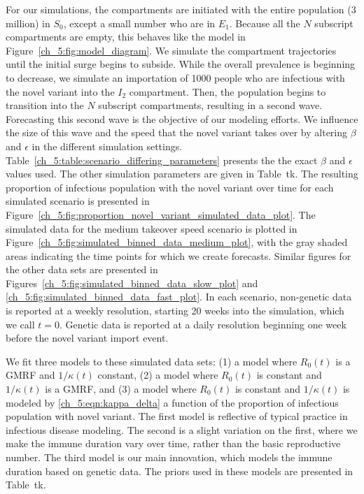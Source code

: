 For our simulations, the compartments are initiated with the entire population (3 million) in \( S_0 \), except a small number who are in \( E_1 \).
Because all the \( N \) subscript compartments are empty, this behaves like the model in Figure~\ref{ch_5:fig:model_diagram}.
We simulate the compartment trajectories until the initial surge begins to subside.
While the overall prevalence is beginning to decrease, we simulate an importation of 1000 people who are infectious with the novel variant into the \( I_2 \) compartment.
Then, the population begins to transition into the \( N \) subscript compartments, resulting in a second wave.
Forecasting this second wave is the objective of our modeling efforts.
We influence the size of this wave and the speed that the novel variant takes over by altering \( \beta \) and \( \epsilon \) in the different simulation settings.
Table~\ref{ch_5:table:scenario_differing_parameters} presents the  the exact \( \beta \) and \( \epsilon \) values used.
The other simulation parameters are given in Table~tk.
The resulting proportion of infectious population with the novel variant over time for each simulated scenario is presented in Figure~\ref{ch_5:fig:proportion_novel_variant_simulated_data_plot}.
The simulated data for the medium takeover speed scenario is plotted in Figure~\ref{ch_5:fig:simulated_binned_data_medium_plot}, with the gray shaded areas indicating the time points for which we create forecasts.
Similar figures for the other data sets are presented in Figures~\ref{ch_5:fig:simulated_binned_data_slow_plot} and \ref{ch_5:fig:simulated_binned_data_fast_plot}.
In each scenario, non-genetic data is reported at a weekly resolution, starting 20 weeks into the simulation, which we call \( t = 0 \).
Genetic data is reported at a daily resolution beginning one week before the novel variant import event.

We fit three models to these simulated data sets: (1) a model where \( R_0(t) \) is a GMRF and \( 1 / \kappa(t) \) constant, (2) a model where \( R_0(t) \) is constant and \( 1 / \kappa(t) \) is a GMRF, and (3) a model where \( R_0(t) \) is constant and \( 1 / \kappa(t) \) is modeled by \eqref{ch_5:eqn:kappa_delta} a function of the proportion of infectious population with novel variant.
The first model is reflective of typical practice in infectious disease modeling.
The second is a slight variation on the first, where we make the immune duration vary over time, rather than the basic reproductive number.
The third model is our main innovation, which models the immune duration based on genetic data.
The priors used in these models are presented in Table~tk.

